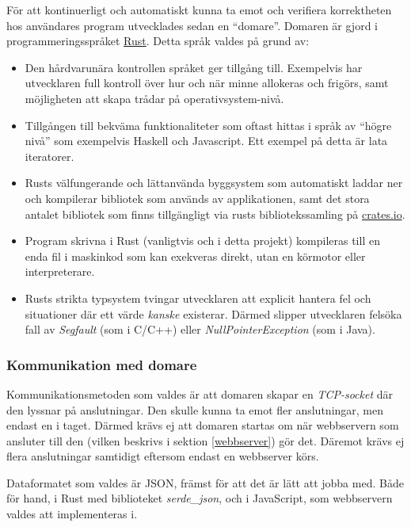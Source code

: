 \documentclass{article}
\begin{document}
För att kontinuerligt och automatiskt kunna ta emot och verifiera korrektheten
hos användares program utvecklades sedan en ``domare''. Domaren är gjord i
programmeringsspråket \href{https://rust-lang.org}{Rust}. Detta språk valdes på
grund av:

\begin{itemize}
	\item Den hårdvarunära kontrollen språket ger tillgång till. Exempelvis har
		utvecklaren full kontroll över hur och när minne allokeras och frigörs,
		samt möjligheten att skapa trådar på operativsystem-nivå.
	\item Tillgången till bekväma funktionaliteter som oftast hittas i språk av
		``högre nivå'' som exempelvis Haskell och Javascript. Ett exempel på detta
		är lata iteratorer.
	\item Rusts välfungerande och lättanvända byggsystem som automatiskt
		laddar ner och kompilerar bibliotek som används av applikationen, samt
		det stora antalet bibliotek som finns tillgängligt via rusts
		bibliotekssamling på \href{https://crates.io}{crates.io}.
	\item Program skrivna i Rust (vanligtvis och i detta projekt) kompileras
		till en enda fil i maskinkod som kan exekveras direkt, utan en körmotor
		eller interpreterare.
	\item Rusts strikta typsystem tvingar utvecklaren att explicit hantera fel
		och situationer där ett värde \textit{kanske} existerar. Därmed slipper
		utvecklaren felsöka fall av \textit{Segfault} (som i C/C++) eller
		\textit{NullPointerException} (som i Java).
\end{itemize}

\subsubsection{Kommunikation med domare}

Kommunikationsmetoden som valdes är att domaren skapar en \textit{TCP-socket}
där den lyssnar på anslutningar. Den skulle kunna ta emot fler anslutningar, men
endast en i taget. Därmed krävs ej att domaren startas om när webbservern som
ansluter till den (vilken beskrivs i sektion \ref{webbserver}) gör det. Däremot
krävs ej flera anslutningar samtidigt eftersom endast en webbserver körs.

Dataformatet som valdes är JSON, främst för att det är lätt att jobba med. Både
för hand, i Rust med biblioteket \textit{serde\_json}, och i JavaScript, som
webbservern valdes att implementeras i.
\end{document}
